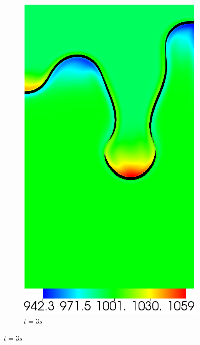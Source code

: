 \begin{figure}[H]
\begin{subfigure}[ht!]{0.2\textwidth}
		\includegraphics[width=1\textwidth]{figure/PT_RT/masse_vol/visit0016.png}
		\caption{$t=3s$}
	\end{subfigure}
\end{figure}\vspace{-0.8cm}
